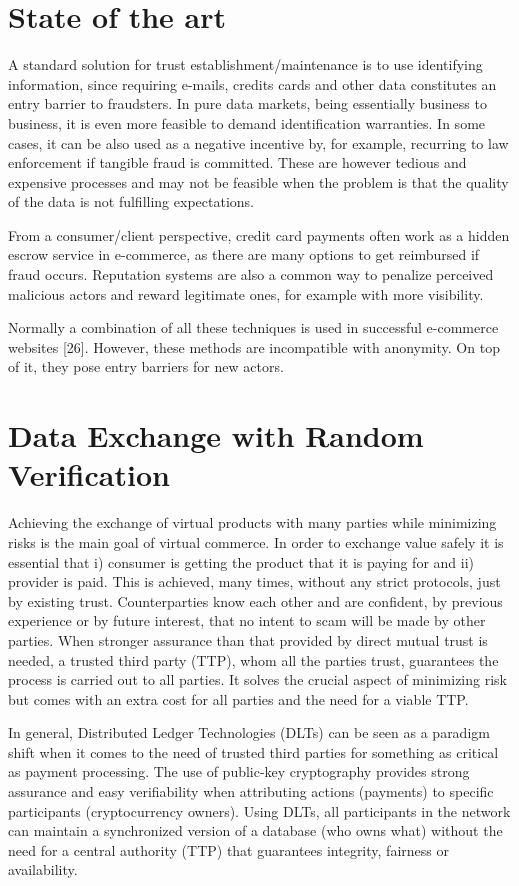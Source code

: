 \documentclass[]{article}
\begin{document}
	\section{State of the art}
	A standard solution for trust establishment/maintenance is to use identifying information, since requiring e-mails, credits cards and other data constitutes an entry barrier to fraudsters. In pure data markets, being essentially business to business, it is even more feasible to demand identification warranties. In some cases, it can be also used as a negative incentive by, for example, recurring to law enforcement if tangible fraud is committed. These are however tedious and expensive processes and may not be feasible when the problem is that the quality of the data is not fulfilling expectations.
	
	From a consumer/client perspective, credit card payments often work as a hidden escrow service in e-commerce, as there are many options to get reimbursed if fraud occurs. Reputation systems are also a common way to penalize perceived malicious actors and reward legitimate ones, for example with more visibility. 

	Normally a combination of all these techniques is used in successful e-commerce websites [26]. However, these methods are incompatible with anonymity. On top of it, they pose entry barriers for new actors.

	\section{Data Exchange with Random Verification}
	Achieving the exchange of virtual products with many parties while minimizing risks is the main goal of virtual commerce. In order to exchange value safely it is essential that i) consumer is getting the product that it is paying for and ii) provider is paid. This is achieved, many times, without any strict protocols, just by existing trust. Counterparties know each other and are confident, by previous experience or by future interest, that no intent to scam will be made by other parties. When stronger assurance than that provided by direct mutual trust is needed, a trusted third party (TTP), whom all the parties trust, guarantees the process is carried out to all parties. It solves the crucial aspect of minimizing risk but comes with an extra cost for all parties and the need for a viable TTP.
	
	In general, Distributed Ledger Technologies (DLTs) can be seen as a paradigm shift when it comes to the need of trusted third parties for something as critical as payment processing. The use of public-key cryptography provides strong assurance and easy verifiability when attributing actions (payments) to specific participants (cryptocurrency owners). Using DLTs, all participants in the network can maintain a synchronized version of a database (who owns what) without the need for a central authority (TTP) that guarantees integrity, fairness or availability. 
	
\end{document}
